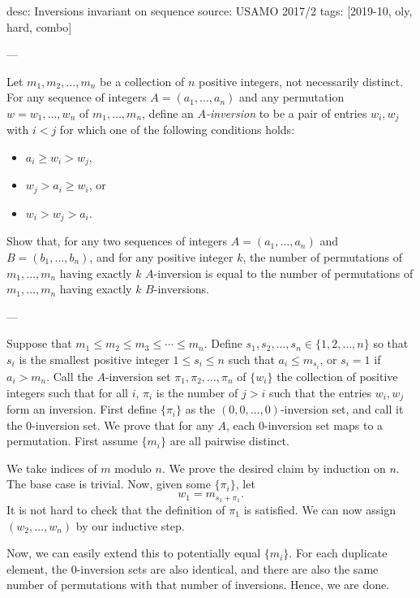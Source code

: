 desc: Inversions invariant on sequence
source: USAMO 2017/2
tags: [2019-10, oly, hard, combo]

---

Let $m_1,m_2,\ldots,m_n$ be a collection of $n$ positive integers, not necessarily distinct. For any sequence of integers $A=(a_1,\ldots,a_n)$ and any permutation $w=w_1,\ldots,w_n$ of $m_1,\ldots,m_n$, define an \textit{$A$-inversion} to be a pair of entries $w_i,w_j$ with $i<j$ for which one of the following conditions holds:
\begin{itemize}[itemsep=0em]
    \item $a_i\ge w_i>w_j$,
    \item $w_j>a_i\ge w_i$, or
    \item $w_i>w_j>a_i$.
\end{itemize}
Show that, for any two sequences of integers $A=(a_1,\ldots,a_n)$ and $B=(b_1,\ldots,b_n)$, and for any positive integer $k$, the number of permutations of $m_1,\ldots,m_n$ having exactly $k$ $A$-inversion is equal to the number of permutations of $m_1,\ldots,m_n$ having exactly $k$ $B$-inversions.

---

Suppose that $m_1\le m_2\le m_3\le\cdots\le m_n$. Define $s_1,s_2,\ldots,s_n\in\{1,2,\ldots,n\}$ so that $s_i$ is the smallest positive integer $1\le s_i\le n$ such that $a_i\le m_{s_i}$, or $s_i=1$ if $a_i>m_n$. Call the $A$-inversion set $\pi_1,\pi_2,\ldots,\pi_n$ of $\{w_i\}$ the collection of positive integers such that for all $i$, $\pi_i$ is the number of $j>i$ such that the entries $w_i,w_j$ form an inversion. First define $\{\pi_i\}$ as the $(0,0,\ldots,0)$-inversion set, and call it the $0$-inversion set. We prove that for any $A$, each $0$-inversion set maps to a permutation. First assume $\{m_i\}$ are all pairwise distinct.

We take indices of $m$ modulo $n$. We prove the desired claim by induction on $n$. The base case is trivial. Now, given some $\{\pi_i\}$, let \[w_1=m_{s_1+\pi_1}.\]
It is not hard to check that the definition of $\pi_1$ is satisfied. We can now assign $(w_2,\ldots,w_n)$ by our inductive step.

Now, we can easily extend this to potentially equal $\{m_i\}$. For each duplicate element, the $0$-inversion sets are also identical, and there are  also the same number of permutations with that number of inversions. Hence, we are done.
